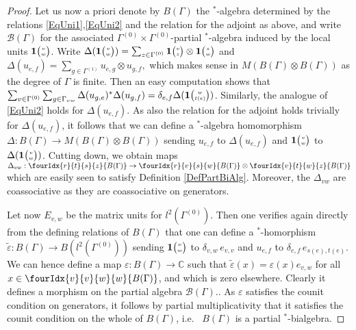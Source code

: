 \documentclass[10pt]{article}
\newcommand{\C}{\mathbb{C}}
\newcommand{\Grt}[3]{#1{\tiny {\begin{pmatrix} #2\\#3\end{pmatrix}}}}
\newcommand{\UnitC}[2]{\Grt{\mathbf{1}}{#1}{#2}}
\newcommand{\Gr}[5]{\fourIdx{#2}{#4}{#3}{#5}{#1}}%
\theoremstyle{definition}
\numberwithin{equation}{section}
\begin{document}
\begin{proof}
Let us now a priori denote by $B(\Gamma)$ the $^*$-algebra determined by the relations \eqref{EqUni1},\eqref{EqUni2} and the relation for the adjoint as above, and write $\mathscr{B}(\Gamma)$ for the associated $\Gamma^{(0)}\times \Gamma^{(0)}$-partial $^*$-algebra induced by the local units $\UnitC{v}{w}$. Write $\Delta(\UnitC{v}{w}) = \sum_{z\in \Gamma^{(0)}} \UnitC{v}{z}\otimes \UnitC{z}{w}$ and $\Delta(u_{e,f}) = \sum_{g\in \Gamma^{(1)}} u_{e,g}\otimes u_{g,f},$ which makes sense in $M(B(\Gamma)\otimes B(\Gamma))$ as the degree of $\Gamma$ is finite. Then an easy computation shows that $ \sum_{v\in \Gamma^{(0)}}\sum_{g\in \Gamma_{vw}}\Delta(u_{g,e})^*\Delta(u_{g,f})= \delta_{e,f} \Delta(\UnitC{w}{t(e)})$. Similarly, the analogue of \eqref{EqUni2} holds for $\Delta(u_{e,f})$. As also the relation for the adjoint holds trivially for $\Delta(u_{e,f})$, it follows that we can define a $^*$-algebra homomorphism $\Delta:B(\Gamma)\rightarrow M(B(\Gamma)\otimes B(\Gamma))$ sending $u_{e,f}$ to $\Delta(u_{e,f})$ and $\UnitC{v}{w}$ to $\Delta(\UnitC{v}{w})$. Cutting down, we obtain maps $\Delta_{vw}:\Gr{B(\Gamma)}{r}{s}{t}{z}\rightarrow \Gr{B(\Gamma)}{r}{s}{v}{w}\otimes \Gr{B(\Gamma)}{v}{w}{t}{z}$ which are easily seen to satisfy Definition \ref{DefPartBiAlg}. Moreover, the $\Delta_{vw}$ are coassociative as they are coassociative on generators.

Let now $E_{v,w}$ be the matrix units for $l^2(\Gamma^{(0)})$. Then one verifies again directly from the defining relations of $B(\Gamma)$ that one can define a $^*$-homorphism $\widetilde{\varepsilon}: B(\Gamma)\rightarrow B(l^2(\Gamma^{(0)}))$ sending $\UnitC{v}{w}$ to $\delta_{v,w}\, e_{v,v}$ and $u_{e,f}$ to $\delta_{e,f}\, e_{s(e),t(e)}$. We can hence define a map $\varepsilon: B(\Gamma)\rightarrow \C$ such that $\widetilde{\varepsilon}(x) = \varepsilon(x) e_{v,w}$ for all $x\in \Gr{B(\Gamma)}{v}{w}{v}{w}$, and which is zero elsewhere. Clearly it defines a morphism on the partial algebra $\mathscr{B}(\Gamma)$.. As $\varepsilon$ satisfies the counit condition on generators, it follows by partial multiplicativity that it satisfies the counit condition on the whole of $B(\Gamma)$, i.e.~ $B(\Gamma)$ is a partial $^*$-bialgebra. 


\end{proof}
\end{document}
